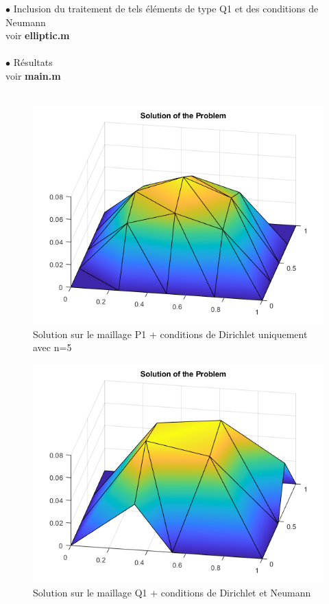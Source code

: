 \documentclass{article}
\begin{document}
$\bullet$ Inclusion du traitement de tels éléments de type Q1 et des conditions de Neumann \\ 

voir \textbf{elliptic.m} \\ \\ 

$\bullet$ Résultats \\

voir \textbf{main.m} \\ \\ 
\begin{figure}[H]
\centering
\includegraphics[width=12cm]{P1.png}
\caption{Solution sur le maillage P1 + conditions de Dirichlet uniquement avec n=5}
\end{figure}

\begin{figure}[H]
\centering
\includegraphics[width=12cm]{Q1.png}
\caption{Solution sur le maillage Q1 + conditions de Dirichlet et Neumann}
\end{figure}
\end{document}
